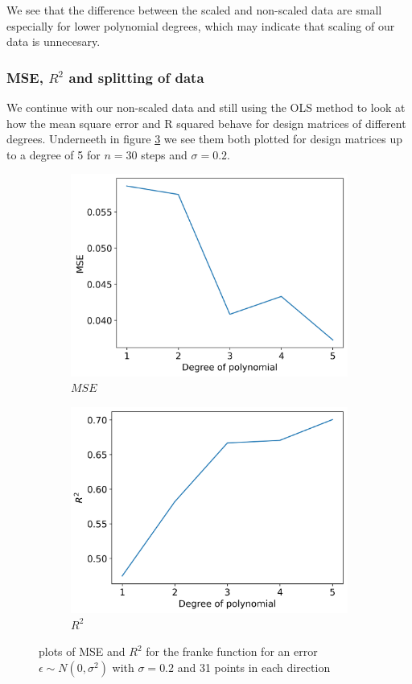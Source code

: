 \documentclass[12pt]{article}
\begin{document}
We see that the difference between the scaled and non-scaled data are small especially for lower polynomial degrees, which may indicate that scaling of our data is unnecesary.

\subsubsection{MSE, $R^2$ and splitting of data}

We continue with our non-scaled data and still using the OLS method to look at how the mean square error and R squared behave for design matrices of different degrees. Underneeth in figure \ref{fig:r2_mse_5} we see them both plotted for design matrices up to a degree of 5 for $n=30$ steps and $\sigma=0.2$.
\begin{figure}[H]
  \begin{subfigure}{.5\textwidth}
    \centering
    \includegraphics[width=\textwidth]{../figures/mse_ols_5.png}
    \caption{$MSE$}
    \label{fig:}
  \end{subfigure}
  \begin{subfigure}{.5\textwidth}
    \centering
    \includegraphics[width=\textwidth]{../figures/r2_ols_5.png}
    \caption{$R^2$}
    \label{fig:}
  \end{subfigure}
  \caption{plots of MSE and $R^2$ for the franke function for an error $\epsilon \sim N(0, \sigma^2)$ with $\sigma=0.2$ and 31 points in each direction}
  \label{fig:r2_mse_5}
\end{figure}
\end{document}
